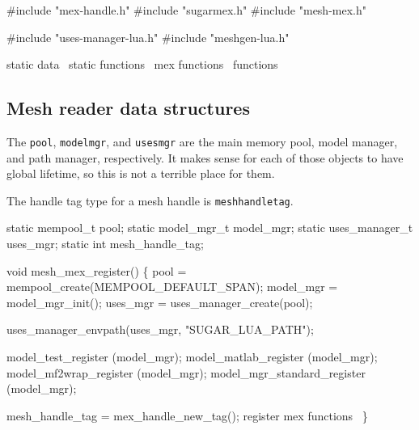 #include "mex-handle.h"
#include "sugarmex.h"
#include "mesh-mex.h"

#include "uses-manager-lua.h"
#include "meshgen-lua.h"

\LA{}static data~{\nwtagstyle{}}\RA{}
\LA{}static functions~{\nwtagstyle{}}\RA{}
\LA{}mex functions~{\nwtagstyle{}}\RA{}
\LA{}functions~{\nwtagstyle{}}\RA{}
\nwendcode{}\nwdocspar


\subsection{Mesh reader data structures}

The {\tt{}pool}, {\tt{}model{}mgr}, and {\tt{}uses{}mgr} are the main memory
pool, model manager, and path manager, respectively.  It makes sense
for each of those objects to have global lifetime, so this is not
a terrible place for them.

The handle tag type for a mesh handle is {\tt{}mesh{}handle{}tag}.

\nwenddocs{}\endmoddef
static mempool_t       pool;
static model_mgr_t     model_mgr;
static uses_manager_t  uses_mgr;
static int             mesh_handle_tag;

\nwendcode{}\nwdocspar

\nwenddocs{}\endmoddef
void mesh_mex_register()
\{
    pool      = mempool_create(MEMPOOL_DEFAULT_SPAN);
    model_mgr = model_mgr_init();
    uses_mgr  = uses_manager_create(pool);

    uses_manager_envpath(uses_mgr, "SUGAR_LUA_PATH");

    model_test_register         (model_mgr);
    model_matlab_register       (model_mgr);
    model_mf2wrap_register      (model_mgr);
    model_mgr_standard_register (model_mgr);

    mesh_handle_tag = mex_handle_new_tag();
    \LA{}register mex functions~{\nwtagstyle{}}\RA{}
\}

\nwendcode{}\nwdocspar

